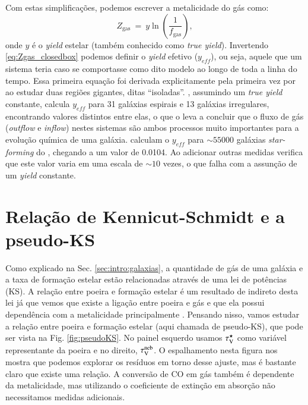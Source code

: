 Com estas simplificações, podemos escrever a metalicidade do gás como:
\begin{equation}
	Z_{\mathrm{gas}}\ =\ y \ln \left(\frac{1}{f_{\mathrm{gas}}}\right),
	\label{eq:Zgas_closedbox}
\end{equation}
\noindent onde $y$ é o {\em yield} estelar (também conhecido como {\em true yield}). Invertendo
\eqref{eq:Zgas_closedbox} podemos definir o {\em yield} efetivo ($y_{eff}$), ou seja, aquele que um
sistema teria caso se comportasse como dito modelo ao longo de toda a linha do tempo. Essa primeira equação foi derivada explicitamente pela primeira vez por \citet{Searle.Sargent.1972a} ao
estudar duas regiões \Hii gigantes, ditas ``isoladas''. \citet{Garnett.2002a}, assumindo um {\em
true yield} constante, calcula $y_{eff}$ para 31 galáxias espirais e 13 galáxias irregulares,
encontrando valores distintos entre elas, o que o leva a concluir que o fluxo de gás ({\em outflow}
e {\em inflow}) nestes sistemas são ambos processos muito importantes para a evolução química de
uma galáxia. \citet{Tremonti.etal.2004a} calculam o $y_{eff}$ para $\sim 55000$ galáxias {\em
star-forming} do \SDSS, chegando a um valor de 0.0104. Ao adicionar outras medidas verifica que
este valor varia em uma escala de $\sim 10$ vezes, o que falha com a assunção de um {\em yield}
constante.

\section{Relação de Kennicut-Schmidt e a pseudo-KS}
\label{sec:gasfrac:KS}

Como explicado na Sec. \ref{sec:intro:galaxias}, a quantidade de gás de uma galáxia e a taxa de
formação estelar estão relacionadas através de uma lei de potências (KS). A relação entre poeira e
formação estelar é um resultado de indireto desta lei já que vemos que existe a ligação entre poeira
e gás e que ela possui dependência com a metalicidade principalmente \citep[][e suas
referências]{Magdis.etal.2011a, Leroy.etal.2011a, Santini.etal.2014a}. Pensando nisso, vamos estudar
a relação entre poeira e formação estelar (aqui chamada de pseudo-KS), que pode ser vista na Fig.
\ref{fig:pseudoKS}. No painel esquerdo usamos $\tau_{\mathrm{V}}^\star$ como variável representante da poeira e no
direito, $\tau_{\mathrm{V}}^{\mathrm{neb}}$. O espalhamento nesta figura nos mostra que podemos explorar os resíduos em torno
desse ajuste, mas é bastante claro que existe uma relação. A conversão de CO em gás também é
dependente da metalicidade, mas utilizando o coeficiente de extinção em absorção não necessitamos
medidas adicionais.

